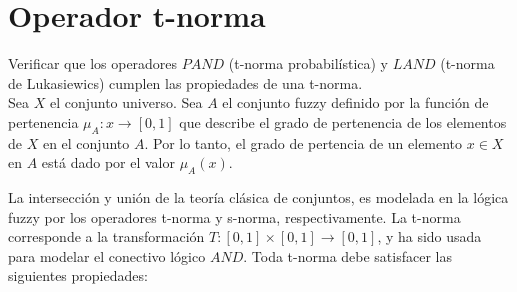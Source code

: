 \documentclass[letterpaper,spanish,11pt]{article}
\begin{document}
\maketitle


\section{Operador t-norma}
Verificar que los operadores $PAND$ (t-norma probabil\'{i}stica) y $LAND$ (t-norma
de Lukasiewics) cumplen las propiedades de una t-norma.\\

Sea $X$ el conjunto universo. Sea $A$ el conjunto fuzzy definido por la funci\'{o}n
de pertenencia $\mu_{A}:x \rightarrow [0,1]$ que describe el
grado de pertenencia  de los elementos de $X$ en el conjunto $A$.
Por lo tanto, el grado de pertencia de un elemento $x \in X$ en $A$ est\'{a}
dado por el valor $\mu_{A}(x)$.


La intersecci\'{o}n y uni\'{o}n de la teor\'{i}a cl\'{a}sica de conjuntos, es
modelada en la l\'{o}gica fuzzy por los operadores t-norma y s-norma,
respectivamente. 
La t-norma corresponde a la transformaci\'{o}n $T:[0,1] \times [0,1]
\rightarrow [0,1]$, y ha sido usada para modelar el conectivo l\'{o}gico $AND$. 
Toda t-norma debe satisfacer las siguientes propiedades:

\end{document}
